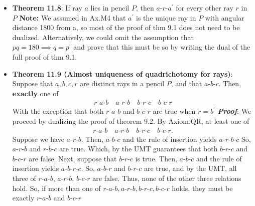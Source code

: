 \documentclass{report}
\begin{document}
\begin{itemize}
                \item \textbf{Theorem 11.8}: If ray $a$ lies in pencil $P$, then $ a\text{-}r\text{-}a^{\prime} $ for every other ray $r$ in $P$
                    \bigbreak \noindent 
                    \textbf{Note:} We assumed in Ax.M4 that $a^{\prime} $ is the unique ray in $P$ with angular distance 1800 from a, so most of the proof of thm 9.1 does not need to be dualized. Alternatively, we could omit the assumption that $pq =180 \implies q = p^{\prime} $ and prove that this must be so by writing the dual of the full proof of thm 9.1.
                \item \textbf{Theorem 11.9 (Almost uniqueness of quadrichotomy for rays)}: Suppose that $a,b,c,r$ are distinct rays in a pencil $P$, and that $ a\text{-}b\text{-}c$. Then, \textbf{exactly} one of 
                    \begin{align*}
                        r\text{-}a\text{-}b \quad a\text{-}r\text{-}b \quad b\text{-}r\text{-}c \quad b\text{-}c\text{-}r
                    \end{align*}
                    With the exception that both $ r\text{-}a\text{-}b $ and $ b\text{-}c\text{-}r$ are true when $r = b^{\prime} $
                    \bigbreak \noindent 
                    \textbf{\textit{Proof}}: We proceed by dualizing the proof of theorem 9.2.
                    \bigbreak \noindent 
                    By Axiom.QR, at least one of 
                    \begin{align*}
                        r\text{-}a\text{-}b \quad a\text{-}r\text{-}b \quad b\text{-}r\text{-}c \quad b\text{-}c\text{-}r
                    .\end{align*}
                    Suppose we have $ a\text{-}r\text{-}b$. Then, $ a\text{-}b\text{-}c$ and the rule of insertion yields $ a\text{-}r\text{-}b\text{-}c $
                    \bigbreak \noindent 
                    So, $ a\text{-}r\text{-}b $ and $ r\text{-}b\text{-}c$ are true. Which, by the UMT guarantees that both $ b\text{-}r\text{-}c $ and $ b\text{-}c\text{-}r$ are false. 
                    \bigbreak \noindent 
                    Next, suppose that $ b\text{-}r\text{-}c$ is true. Then, $ a\text{-}b\text{-}c$ and the rule of insertion yields $ a\text{-}b\text{-}r\text{-}c$. So, $ a\text{-}b\text{-}r$ and $ b\text{-}r\text{-}c$ are true, and by the UMT, all three of  $ r\text{-}a\text{-}b$, $ a\text{-}r\text{-}b$, $ b\text{-}c\text{-}r$ are false. Thus, none of the other three relations hold.
                    \bigbreak \noindent 
                    So, if more than one of $ r\text{-}a\text{-}b, a\text{-}r\text{-}b, b\text{-}r\text{-}c, b\text{-}c\text{-}r$ holds, they must be exactly $ r\text{-}a\text{-}b$ and $ b\text{-}c\text{-}r$

\end{itemize}
\end{document}
